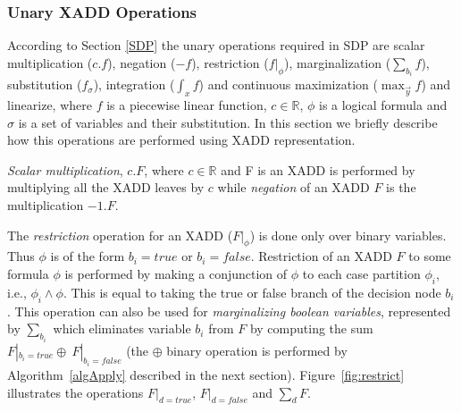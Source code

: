 \documentclass[twoside,11pt]{article}
\begin{document}
\subsubsection{Unary XADD Operations}

According to Section \ref{SDP} the unary operations required in SDP are scalar multiplication ($c.f$), negation ($- f$), restriction ($f|_\phi$), marginalization ($\sum_{b_i}f$), substitution ($f_\sigma$), integration  ($\int_x f$) and continuous maximization ($\max_{\vec{y}} f$) and linearize, where $f$ is a piecewise linear function, $c \in \mathbb{R}$, $\phi$ is a logical formula and $\sigma$ is a set of variables and their substitution. In this section we briefly describe how this operations are performed using XADD representation.

\emph{Scalar multiplication}, $c.F$, where $c \in \mathbb{R}$ and F is an XADD is performed by multiplying all the XADD leaves by $c$ while \emph{negation} of an XADD $F$ is the multiplication  $-1.F$.

The \emph{restriction} operation for an XADD ($F|_{\phi}$) is done only over binary variables. Thus $\phi$ is of the form $b_i=true$ or  $b_i=false$. Restriction of an XADD $F$ to some formula $\phi$ is performed by making a conjunction of $\phi$ to each case partition  $\phi_i$, i.e., $\phi_i \wedge \phi $. This is equal to taking the true or false branch of the decision node $b_i$.
This operation can also be used for \emph{marginalizing boolean variables}, represented by $\sum_{b_i}$ which eliminates variable $b_i$ from $F$  by computing the sum  $F|_{b_i=true} \oplus \ F|_{b_i=false}$ (the $\oplus$ binary operation is performed by Algorithm~\ref{algApply} described in the next section). Figure~\ref{fig:restrict} illustrates the operations  $F|_{d=true}$, $F|_{d=false}$ and  $\sum_{d}F$. 
\end{document}
